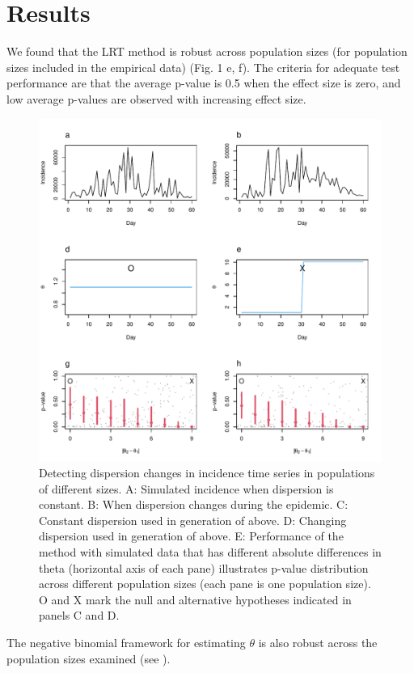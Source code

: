 \documentclass[10pt,letterpaper]{article}
\begin{document}
\section*{Results}
We found that the LRT method is robust across population sizes (for population sizes included in the empirical data) (Fig. 1 e, f).
The criteria for adequate test performance are that the average p-value is 0.5 when the effect size is zero, and low average p-values are observed with increasing effect size. 
\begin{figure}[!h]
\includegraphics[width=1\textwidth]{fig1}
\caption{
Detecting dispersion changes in incidence time series in populations of different sizes. A: Simulated incidence when dispersion is constant. B: When dispersion changes during the epidemic. C: Constant dispersion used in generation of above. D: Changing dispersion used in generation of above. E: Performance of the method with simulated data that has different absolute differences in theta (horizontal axis of each pane) illustrates p-value distribution across different population sizes (each pane is one population size). O and X mark the null and alternative hypotheses indicated in panels C and D. 
 }
\label{fig1}
\end{figure}
The negative binomial framework for estimating \begin{math}\theta\end{math} is also robust across the population sizes examined (see ).
\end{document}
